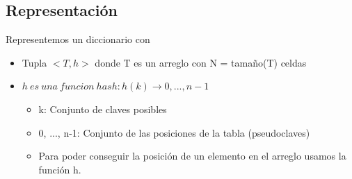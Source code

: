 \documentclass[10pt,a4paper]{article}
\begin{document}
\subsection*{Representación}
Representemos un diccionario con
\begin{itemize}
    \item Tupla $<T, h>$ donde T es un arreglo con N = tamaño(T) celdas
    \item $h \ es \ una \ funcion \ hash:h(k) \rightarrow {0,..., n-1}$
    \begin{itemize}
        \item k: Conjunto de claves posibles 
        \item {0, ..., n-1}: Conjunto de las posiciones de la tabla (pseudoclaves)
        \item Para poder conseguir la posición de un elemento en el arreglo usamos la función h.
    \end{itemize}
\end{itemize}
\end{document}

